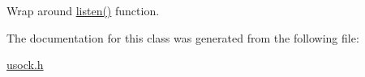 Wrap around \hyperlink{classusock_1_1ServerSocket_c6cd2070380b84275c5f69265c57713b}{listen()} function. 



The documentation for this class was generated from the following file:\begin{CompactItemize}
\item 
\hyperlink{usock_8h}{usock.h}\end{CompactItemize}
